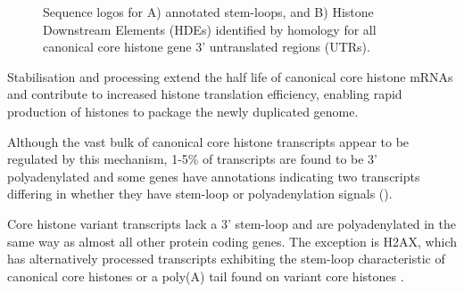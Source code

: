   \begin{figure}
    \centering
    \hfill
    \caption{%
      Sequence logos for A) annotated stem-loops, and 
      B) Histone Downstream Elements (HDEs) identified by homology
      for all canonical core histone gene 3' untranslated regions (UTRs).
    }
  \end{figure}

  Stabilisation and processing extend the half life of canonical core histone \mbox{mRNAs}
  and contribute to increased histone translation efficiency,
  enabling rapid production of histones to package the newly duplicated genome.

  Although the vast bulk of canonical core histone transcripts 
  appear to be regulated by this mechanism, 
  1-5\% of transcripts are found to be 3' polyadenylated \citep{YangGenomeBiol2011}
  and some genes have annotations indicating two transcripts
  differing in whether they have stem-loop or polyadenylation signals ().

  Core histone variant transcripts lack a 3' stem-loop and are
  polyadenylated in the same way as almost all other protein coding genes.
  The exception is H2AX, which has alternatively processed transcripts
  exhibiting the stem-loop characteristic of canonical core histones
  or a poly(A) tail found on variant core histones \citep{HTwoAX-transcripts,our-H2AX-review}.
